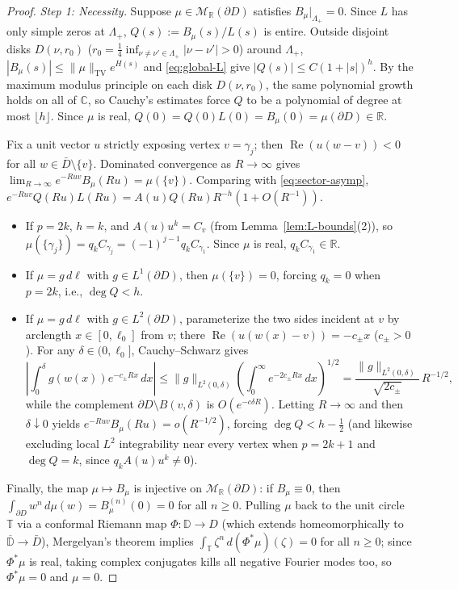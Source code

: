 \documentclass[11pt,reqno]{amsart}
\theoremstyle{definition}
\theoremstyle{remark}
\newcommand{\C}{\mathbb{C}}
\newcommand{\R}{\mathbb{R}}
\begin{document}
\begin{proof}
\emph{Step 1: Necessity.} Suppose $\mu \in \mathcal{M}_\R(\partial D)$ satisfies $B_\mu|_{\Lambda_+} = 0$. Since $L$ has only simple zeros at $\Lambda_+$, $Q(s) := B_\mu(s)/L(s)$ is entire. Outside disjoint disks $D(\nu, r_0)$ ($r_0 = \frac14\inf_{\nu\ne\nu'\in\Lambda_+}|\nu-\nu'| > 0$) around $\Lambda_+$, $|B_\mu(s)| \le \|\mu\|_{\mathrm{TV}} e^{H(s)}$ and \eqref{eq:global-L} give $|Q(s)| \le C(1 + |s|)^h$. By the maximum modulus principle on each disk $D(\nu, r_0)$, the same polynomial growth holds on all of $\C$, so Cauchy's estimates force $Q$ to be a polynomial of degree at most $\lfloor h \rfloor$. Since $\mu$ is real, $Q(0) = Q(0)L(0) = B_\mu(0) = \mu(\partial D) \in \R$.

Fix a unit vector $u$ strictly exposing vertex $v = \gamma_j$; then $\operatorname{Re}(u(w - v)) < 0$ for all $w \in \bar D \setminus \{v\}$. Dominated convergence as $R \to \infty$ gives $\lim_{R\to\infty} e^{-R u v} B_\mu(R u) = \mu(\{v\})$. Comparing with \eqref{eq:sector-asymp}, $e^{-R u v} Q(R u) L(R u) = A(u) Q(R u) R^{-h}(1 + O(R^{-1}))$.
\begin{itemize}
  \item If $p = 2k$, $h = k$, and $A(u) u^k = C_v$ (from Lemma~\ref{lem:L-bounds}(2)), so $\mu(\{\gamma_j\}) = q_k C_{\gamma_j} = (-1)^{j-1} q_k C_{\gamma_1}$. Since $\mu$ is real, $q_k C_{\gamma_1} \in \R$.
  \item If $\mu = g\,d\ell$ with $g \in L^1(\partial D)$, then $\mu(\{v\}) = 0$, forcing $q_k = 0$ when $p = 2k$, i.e., $\deg Q < h$.
  \item If $\mu = g\,d\ell$ with $g \in L^2(\partial D)$, parameterize the two sides incident at $v$ by arclength $x \in [0, \ell_0]$ from $v$; there $\operatorname{Re}(u(w(x) - v)) = -c_\pm x$ ($c_\pm > 0$). For any $\delta \in (0, \ell_0]$, Cauchy--Schwarz gives
  \[
    \left|\int_0^\delta g(w(x)) e^{-c_\pm R x}\,dx\right|
    \le \|g\|_{L^2(0,\delta)} \left(\int_0^\infty e^{-2 c_\pm R x}\,dx\right)^{1/2}
    = \frac{\|g\|_{L^2(0,\delta)}}{\sqrt{2 c_\pm}}\, R^{-1/2},
  \]
  while the complement $\partial D \setminus B(v,\delta)$ is $O(e^{-c\delta R})$. Letting $R \to \infty$ and then $\delta \downarrow 0$ yields $e^{-R u v} B_\mu(R u) = o(R^{-1/2})$, forcing $\deg Q < h - \frac12$ (and likewise excluding local $L^2$ integrability near every vertex when $p = 2k+1$ and $\deg Q = k$, since $q_k A(u) u^k \ne 0$).
\end{itemize}
Finally, the map $\mu \mapsto B_\mu$ is injective on $\mathcal{M}_\R(\partial D)$: if $B_\mu \equiv 0$, then $\int_{\partial D} w^n\,d\mu(w) = B_\mu^{(n)}(0) = 0$ for all $n \ge 0$. Pulling $\mu$ back to the unit circle $\mathbb{T}$ via a conformal Riemann map $\Phi : \mathbb{D} \to D$ (which extends homeomorphically to $\overline{\mathbb{D}} \to \bar D$), Mergelyan's theorem implies $\int_{\mathbb{T}} \zeta^n\,d(\Phi^*\mu)(\zeta) = 0$ for all $n \ge 0$; since $\Phi^*\mu$ is real, taking complex conjugates kills all negative Fourier modes too, so $\Phi^*\mu = 0$ and $\mu = 0$.


\end{proof}
\end{document}
